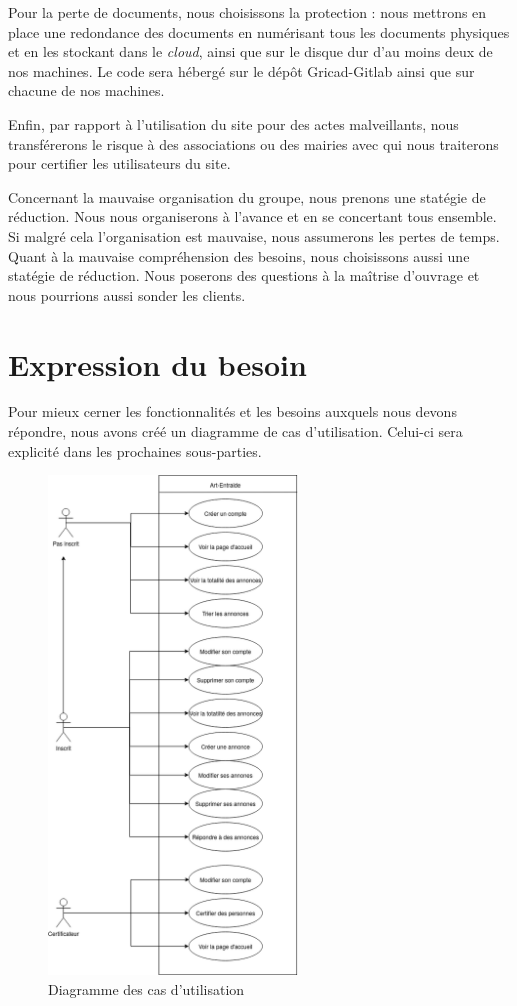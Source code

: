 \documentclass[a4paper,11pt]{article}
\begin{document}
Pour la perte de documents, nous choisissons la protection : nous mettrons en place une redondance
des documents en numérisant tous les documents physiques et en les stockant dans le \textit{cloud}, ainsi
que sur le disque dur d’au moins deux de nos machines. Le code sera hébergé sur le dépôt Gricad-Gitlab ainsi que sur chacune de nos machines.

Enfin, par rapport à l’utilisation du site pour des actes malveillants, nous transférerons le risque à des
associations ou des mairies avec qui nous traiterons pour certifier les utilisateurs du site.

Concernant la mauvaise organisation du groupe, nous prenons une statégie de réduction. Nous nous organiserons
à l'avance et en se concertant tous ensemble. Si malgré cela l'organisation est mauvaise, nous
assumerons les pertes de temps. Quant à la mauvaise compréhension des besoins, nous choisissons
aussi une statégie de réduction. Nous poserons des questions à la maîtrise d'ouvrage et nous pourrions aussi sonder
les clients.\\

\newpage


\section{Expression du besoin}

Pour mieux cerner les fonctionnalités et les besoins auxquels nous devons répondre, nous avons créé un diagramme de cas d'utilisation.
Celui-ci sera explicité dans les prochaines sous-parties.

\begin{figure}[H]
  \includegraphics[width=250px]{../Conception/DCU.png}
  \caption{Diagramme des cas d'utilisation}
  \label{fig:DCU}
\end{figure}
\end{document}
